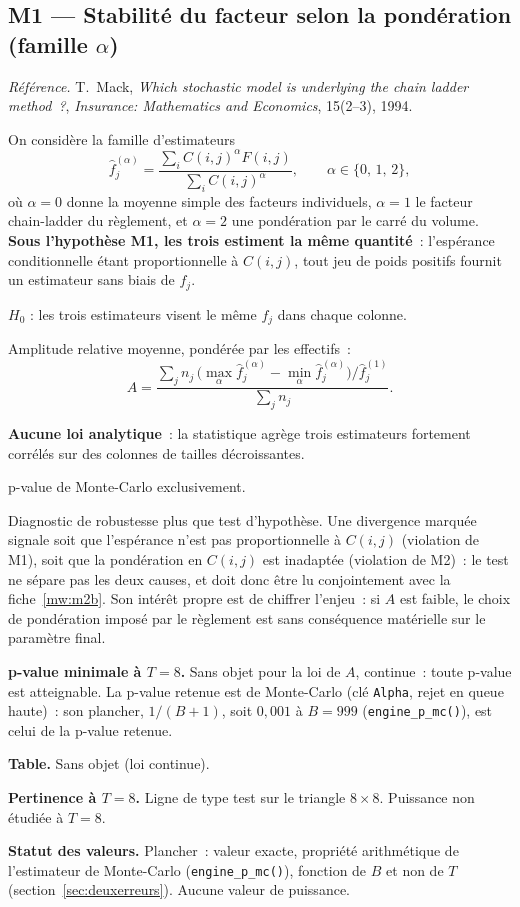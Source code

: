 \documentclass[a4paper,11pt]{article}
\newcommand{\code}[1]{\texttt{\small #1}}
\newcommand{\refl}[1]{{\small\textcolor{maincolor!70!black}{\textit{Référence.} #1}}\par\smallskip}
\newcounter{ficheid}
\newenvironment{fiche}[1]{%
  \stepcounter{ficheid}%
  \phantomsection
  \subsection{#1}%
  \label{fiche:\theficheid}%
}{%
  \end{description}\vspace{0.5em}%
}
\newcommand{\Cadre}{%
  \begin{description}[leftmargin=0pt, style=unboxed, itemsep=3pt, topsep=3pt, parsep=2pt]%
  \item[\textcolor{financeblue}{\textbf{1. Cadre, notations et hypothèses de validité (non testées).}}]}
\newcommand{\Hzero}{\item[\textcolor{financeblue}{\textbf{2. Hypothèse nulle.}}]}
\newcommand{\Stat}{\item[\textcolor{financeblue}{\textbf{3. Statistique de test.}}]}
\newcommand{\Loi}{\item[\textcolor{financeblue}{\textbf{4. Loi sous $H_0$.}}]}
\newcommand{\Pval}{\item[\textcolor{financeblue}{\textbf{5. p-value.}}]}
\newcommand{\Usage}{\item[\textcolor{financeblue}{\textbf{6. Usage et limites.}}]}
\newcommand{\Pertinence}{\item[\textcolor{financeblue}{\textbf{7. Pertinence et puissance à faible $T$.}}]}
\begin{document}
\begin{fiche}{M1 --- Stabilité du facteur selon la pondération (famille $\alpha$)}
\label{mw:m1d}
\refl{T.~Mack, \emph{Which stochastic model is underlying the chain ladder
method~?}, \emph{Insurance: Mathematics and Economics}, 15(2--3), 1994.}
\Cadre
On considère la famille d'estimateurs
\[
  \hat f_j^{(\alpha)}
  = \frac{\sum_i C(i,j)^{\alpha} F(i,j)}{\sum_i C(i,j)^{\alpha}},
  \qquad \alpha \in \{0,\,1,\,2\},
\]
où $\alpha = 0$ donne la moyenne simple des facteurs individuels, $\alpha = 1$ le
facteur chain-ladder du règlement, et $\alpha = 2$ une pondération par le carré
du volume. \textbf{Sous l'hypothèse M1, les trois estiment la même quantité}~:
l'espérance conditionnelle étant proportionnelle à $C(i,j)$, tout jeu de poids
positifs fournit un estimateur sans biais de $f_j$.
\Hzero
$H_0$ : les trois estimateurs visent le même $f_j$ dans chaque colonne.
\Stat
Amplitude relative moyenne, pondérée par les effectifs~:
\[
  A = \frac{\sum_j n_j\,
      \big(\max_\alpha \hat f_j^{(\alpha)} - \min_\alpha \hat f_j^{(\alpha)}\big)
      \big/ \hat f_j^{(1)}}{\sum_j n_j}.
\]
\Loi
\textbf{Aucune loi analytique}~: la statistique agrège trois estimateurs
fortement corrélés sur des colonnes de tailles décroissantes.
\Pval
p-value de Monte-Carlo exclusivement.
\Usage
Diagnostic de robustesse plus que test d'hypothèse. Une divergence marquée
signale soit que l'espérance n'est pas proportionnelle à $C(i,j)$ (violation de
M1), soit que la pondération en $C(i,j)$ est inadaptée (violation de M2)~: le
test ne sépare pas les deux causes, et doit donc être lu conjointement avec la
fiche~\ref{mw:m2b}. Son intérêt propre est de chiffrer l'enjeu~: si $A$ est
faible, le choix de pondération imposé par le règlement est sans conséquence
matérielle sur le paramètre final.
\Pertinence
\textbf{p-value minimale à $T = 8$.} Sans objet pour la loi de $A$, continue~: toute p-value est atteignable. La p-value retenue est de Monte-Carlo (clé \code{Alpha}, rejet en queue haute)~: son plancher, $1/(B+1)$, soit $0{,}001$ à $B = 999$ (\code{engine\_p\_mc()}), est celui de la p-value retenue.

\textbf{Table.} Sans objet (loi continue).

\textbf{Pertinence à $T = 8$.} Ligne de type test sur le triangle $8\times 8$. Puissance non étudiée à $T = 8$.

\textbf{Statut des valeurs.} Plancher~: valeur exacte, propriété arithmétique de l'estimateur de Monte-Carlo (\code{engine\_p\_mc()}), fonction de $B$ et non de $T$ (section~\ref{sec:deuxerreurs}). Aucune valeur de puissance.
\end{fiche}
\end{document}
